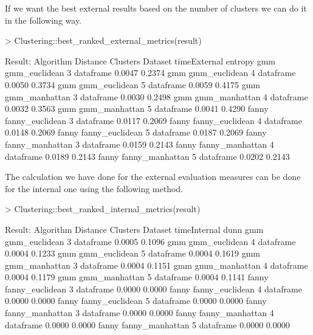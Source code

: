 If we want the best external results based on the number of clusters we can do it in the following way.
\begin{Schunk}
\begin{Sinput}
> Clustering::best_ranked_external_metrics(result)
\end{Sinput}
\begin{Soutput}
Result:
Algorithm  Distance         Clusters   Dataset  timeExternal entropy
  gmm        gmm_euclidean     3      dataframe    0.0047    0.2374
  gmm        gmm_euclidean     4      dataframe    0.0050    0.3734
  gmm        gmm_euclidean     5      dataframe    0.0059    0.4175
  gmm        gmm_manhattan     3      dataframe    0.0030    0.2498
  gmm        gmm_manhattan     4      dataframe    0.0032    0.3563
  gmm        gmm_manhattan     5      dataframe    0.0041    0.4290
fanny      fanny_euclidean     3      dataframe    0.0117    0.2069
fanny      fanny_euclidean     4      dataframe    0.0148    0.2069
fanny      fanny_euclidean     5      dataframe    0.0187    0.2069
fanny      fanny_manhattan     3      dataframe    0.0159    0.2143
fanny      fanny_manhattan     4      dataframe    0.0189    0.2143
fanny      fanny_manhattan     5      dataframe    0.0202    0.2143
\end{Soutput}
\end{Schunk}

The calculation we have done for the external evaluation measures can be done for the internal one using the following method.

\begin{Schunk}
\begin{Sinput}
> Clustering::best_ranked_internal_metrics(result)
\end{Sinput}
\begin{Soutput}
Result:
Algorithm      Distance     Clusters   Dataset  timeInternal   dunn
   gmm       gmm_euclidean     3      dataframe   0.0005      0.1096
   gmm       gmm_euclidean     4      dataframe   0.0004      0.1233
   gmm       gmm_euclidean     5      dataframe   0.0004      0.1619
   gmm       gmm_manhattan     3      dataframe   0.0004      0.1151
   gmm       gmm_manhattan     4      dataframe   0.0004      0.1179
   gmm       gmm_manhattan     5      dataframe   0.0004      0.1141
 fanny     fanny_euclidean     3      dataframe   0.0000      0.0000
 fanny     fanny_euclidean     4      dataframe   0.0000      0.0000
 fanny     fanny_euclidean     5      dataframe   0.0000      0.0000
 fanny     fanny_manhattan     3      dataframe   0.0000      0.0000
 fanny     fanny_manhattan     4      dataframe   0.0000      0.0000
 fanny     fanny_manhattan     5      dataframe   0.0000      0.0000
\end{Soutput}
\end{Schunk}

